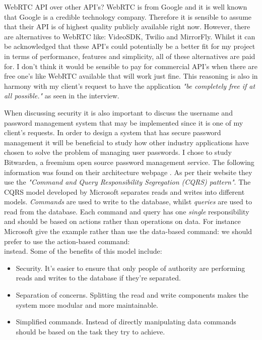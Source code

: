WebRTC API over other API's? WebRTC is from Google and it is 
well known that Google is a credible technology company. 
Therefore it is sensible to assume that their API is of 
highest quality publicly available right now. However, there
are alternatives to WebRTC like: VideoSDK, Twilio and 
MirrorFly. Whilst it can be acknowledged that these API's could
potentially be a better fit for my project in terms of
performance, features and simplicity, all of these alternatives
are paid for. I don't think it would be sensible to pay for
commercial API's when there are free one's like WebRTC
available that will work just fine. This reasoning is also in 
harmony with my client's request to have the application
\textit{"be completely free if at all possible."} as seen in 
the interview. 

\vspace{0.2cm}

When discussing security it is also important to discuss the 
username and password management system that may be implemented
since it is one of my client's requests. In order to design a 
system that has secure password management it will be 
beneficial to study how other industry applications have chosen
to solve the problem of managing user passwords. I chose to 
study Bitwarden, a freemium open source password management 
service. The following information was found on their 
architecture webpage \cite{Bitwarden}. As per their website 
they use the \textit{"Command and Query Responsibility 
Segregation (CQRS) pattern"}. The CQRS model developed by 
Microsoft separates reads and writes into different models. 
\textit{Commands} are used to write to the database, whilst 
\textit{queries} are used to read from the database. Each 
command and query has one \emph{single} responsibility and 
should be based on actions rather than operations on data. For
instance Microsoft give the example rather than use the
data-based command: 
we should prefer to use the action-based command: \\
 instead. Some of the benefits of 
this model include: 

\begin{itemize}
  \item Security. It's easier to ensure that only people of authority are performing reads and writes to the database if 
they're separated.

  \item Separation of concerns. Splitting the read and write components makes the system more modular and more maintainable. 

  \item Simplified commands. Instead of directly manipulating data commands should be based on the task they try to 
achieve.
\end{itemize}

